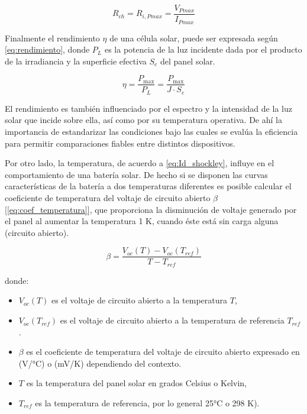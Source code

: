 \vspace{\baselineskip}


\begin{equation}\label{eq:Ri}
R_{ch} = R_{i, Pmax} = \frac{V_{Pmax}}{I_{Pmax}}
\end{equation}

\vspace{\baselineskip}

Finalmente el rendimiento $\eta$ de una célula solar, puede ser expresada según \ref{eq:rendimiento}, donde  $P_L$ es la potencia de la luz incidente dada por el producto de la irradiancia y la superficie efectiva $S_e$ del panel solar.

\begin{equation}\label{eq:rendimiento}
\eta= \frac{P_{\max}}{P_{L}}= \frac{P_{\max}}{J\cdot S_e}
\end{equation}
		
\vspace{\baselineskip}
		
El rendimiento es también influenciado por el espectro y la intensidad de la luz solar que incide sobre ella, así como por su temperatura operativa. De ahí la importancia de estandarizar las condiciones bajo las cuales se evalúa la eficiencia para permitir comparaciones fiables entre distintos dispositivos.

\vspace{\baselineskip}

Por otro lado, la temperatura, de acuerdo a \ref{eq:Id_shockley}, influye en el comportamiento de una batería solar. De hecho si se disponen las curvas características de la batería a dos temperaturas diferentes es posible calcular el coeficiente de temperatura del voltaje de circuito abierto $\beta$ [\ref{eq:coef_temperatura}], que proporciona la disminución de voltaje generado por el panel al aumentar la temperatura 1 K, cuando éste está sin carga alguna (circuito abierto).

\begin{equation}\label{eq:coef_temperatura}
	\beta= \frac{V_{oc}(T) - V_{oc}(T_{ref}) }{T - T_{ref}}
\end{equation}


donde:

\begin{itemize}
	\setlength\itemsep{0.05em}
	\item $V_{oc}(T)$ es el voltaje de circuito abierto a la temperatura $T$,
	\item $V_{oc}(T_{ref})$ es el voltaje de circuito abierto a la temperatura de referencia $T_{ref}$.
	\item $\beta$ es el coeficiente de temperatura del voltaje de circuito abierto expresado en (V/°C) o (mV/K) dependiendo del contexto.
	\item $T$ es la temperatura del panel solar en grados Celsius o Kelvin,
	\item $T_{ref}$ es la temperatura de referencia, por lo general 25°C o 298 K).
\end{itemize}


